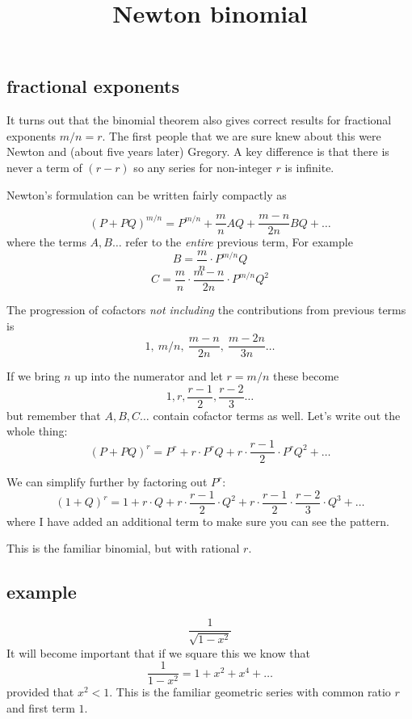 \documentclass[11pt, oneside]{article}
\title{Newton binomial}
\date{}
\begin{document}
\maketitle
\Large


\subsection*{fractional exponents}

It turns out that the binomial theorem also gives correct results for fractional exponents $m/n = r$.  The first people that we are sure knew about this were Newton and (about five years later) Gregory.  A key difference is that there is never a term of $(r-r)$ so any series for non-integer $r$ is infinite.

Newton's formulation can be written fairly compactly as

\[ (P + PQ)^{m/n} = P^{m/n} + \frac{m}{n} AQ + \frac{m - n}{2n}BQ + \dots \]
where the terms $A, B \dots$ refer to the \emph{entire} previous term,   For example
\[ B =  \frac{m}{n} \cdot P^{m/n}Q \]
\[ C = \frac{m}{n} \cdot \frac{m - n}{2n} \cdot P^{m/n}Q^2 \]

The progression of cofactors \emph{not including} the contributions from previous terms is
\[ 1, \ m/n, \ \frac{m - n}{2n}, \ \frac{m - 2n}{3n} \dots \]

If we bring $n$ up into the numerator and let $r = m/n$ these become
\[ 1, r, \frac{r - 1}{2}, \frac{r - 2}{3} \dots \]
but remember that $A,B,C \dots$ contain cofactor terms as well.  Let's write out the whole thing:
\[ (P + PQ)^{r} = P^{r} + r \cdot P^{r}Q + r \cdot \frac{r - 1}{2} \cdot P^{r}Q^2 + \dots \]

We can simplify further by factoring out $P^{r}$:
\[ (1 + Q)^{r} = 1 + r \cdot Q + r \cdot \frac{r - 1}{2} \cdot Q^2 + r \cdot \frac{r - 1}{2} \cdot \frac{r - 2}{3} \cdot Q^3 + \dots \]
where I have added an additional term to make sure you can see the pattern.  

This is the familiar binomial, but with rational $r$.

\subsection*{example}
\[ \frac{1}{\sqrt{1 - x^2}} \]
It will become important that if we square this we know that
\[ \frac{1}{1 - x^2} = 1 + x^2 + x^4 + \dots \]
provided that $x^2 < 1$.  This is the familiar geometric series with common ratio $r$ and first term $1$.
\end{document}
